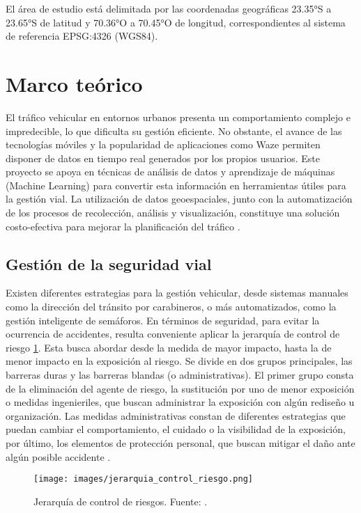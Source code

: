 \documentclass[12pt]{article}
\begin{document}
El área de estudio está delimitada por las coordenadas geográficas 23.35°S a 23.65°S de latitud y 70.36°O a 70.45°O de longitud, correspondientes al sistema de referencia EPSG:4326 (WGS84).

\section{Marco teórico}

El tráfico vehicular en entornos urbanos presenta un comportamiento complejo e impredecible, lo que dificulta su gestión eficiente. No obstante, el avance de las tecnologías móviles y la popularidad de aplicaciones como Waze permiten disponer de datos en tiempo real generados por los propios usuarios. Este proyecto se apoya en técnicas de análisis de datos y aprendizaje de máquinas (Machine Learning) para convertir esta información en herramientas útiles para la gestión vial. La utilización de datos geoespaciales, junto con la automatización de los procesos de recolección, análisis y visualización, constituye una solución costo-efectiva para mejorar la planificación del tráfico \citep{barcelo2005}.

\subsection{Gestión de la seguridad vial}

Existen diferentes estrategias para la gestión vehicular, desde sistemas manuales como la dirección del tránsito por carabineros, o más automatizados, como la gestión inteligente de semáforos. En términos de seguridad, para evitar la ocurrencia de accidentes, resulta conveniente aplicar la jerarquía de control de riesgo \cref{fig:jerarquia_riesgos}. Esta busca abordar desde la medida de mayor impacto, hasta la de menor impacto en la exposición al riesgo. Se divide en dos grupos principales, las barreras duras y las barreras blandas (o administrativas). El primer grupo consta de la eliminación del agente de riesgo, la sustitución por uno de menor exposición o medidas ingenieriles, que buscan administrar la exposición con algún rediseño u organización. Las medidas administrativas constan de diferentes estrategias que puedan cambiar el comportamiento, el cuidado o la visibilidad de la exposición, por último, los elementos de protección personal, que buscan mitigar el daño ante algún posible accidente \citep{niosh2024}.

\begin{figure}[h]
    \centering
    \texttt{[image: images/jerarquia\_control\_riesgo.png]}
    \caption{Jerarquía de control de riesgos. Fuente: \citet{niosh2024}.}
    \label{fig:jerarquia_riesgos}
\end{figure}
\end{document}
